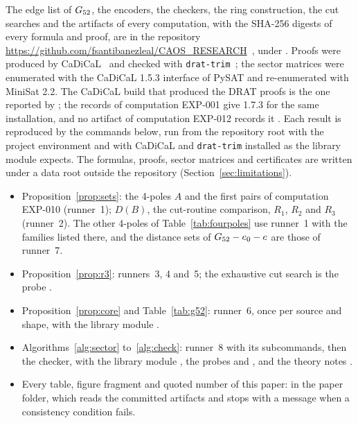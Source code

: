The edge list of $G_{52}$, the encoders, the checkers, the ring construction, the cut searches and
the artifacts of every computation, with the SHA-256 digests of every formula and proof, are in the repository
\url{https://github.com/fsantibanezleal/CAOS_RESEARCH}~\cite{CAOSrepo}, under
. Proofs were produced by CaDiCaL~\cite{CaDiCaL} and checked with
\texttt{drat-trim}~\cite{DRATtrim}; the sector matrices were enumerated with the CaDiCaL 1.5.3 interface of PySAT and re-enumerated with MiniSat 2.2. The CaDiCaL build that produced the DRAT proofs is the one reported by ; the records of computation EXP-001 give 1.7.3 for the same installation, and no artifact of computation EXP-012 records it .
Each result is reproduced by the commands below, run from the repository root with the project environment and with CaDiCaL and \texttt{drat-trim}
installed as the library module  expects. The formulas, proofs, sector matrices and certificates are written under a data root
outside the repository (Section~\ref{sec:limitations}).

\begin{itemize}
\item Proposition~\ref{prop:sets}: the 4-poles $A$ and the first pairs of computation EXP-010 (runner~1); $D(B)$, the cut-routine comparison, $R_1$, $R_2$ and $R_3$ (runner~2). The other 4-poles of Table~\ref{tab:fourpoles} use runner~1 with the families listed there, and the distance sets of $G_{52} - e_0 - e$ are those of runner~7.
\item Proposition~\ref{prop:r3}: runners~3, 4 and~5; the exhaustive cut search is the probe .
\item Proposition~\ref{prop:core} and Table~\ref{tab:g52}: runner~6, once per source and shape, with the library module .
\item Algorithms~\ref{alg:sector} to~\ref{alg:check}: runner~8 with its subcommands, then the checker, with the library module , the probes  and , and the theory notes .
\item Every table, figure fragment and quoted number of this paper:  in the paper folder, which reads the committed artifacts and stops with a message when a consistency condition fails.
\end{itemize}

